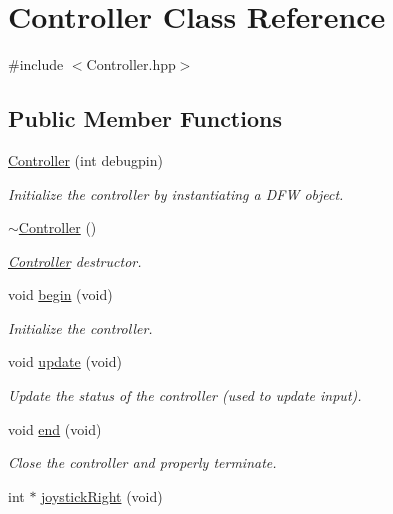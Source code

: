 \hypertarget{class_controller}{}\section{Controller Class Reference}
\label{class_controller}


{\ttfamily \#include $<$Controller.\+hpp$>$}

\subsection*{Public Member Functions}
\begin{DoxyCompactItemize}
\item 
\hyperlink{class_controller_aab64b54728b3f5d68bd2320605bdc51d}{Controller} (int debugpin)
\begin{DoxyCompactList}\small\item\em Initialize the controller by instantiating a D\+FW object. \end{DoxyCompactList}\item 
\hyperlink{class_controller_a0ab87934c4f7a266cfdb86e0f36bc1b5}{$\sim$\+Controller} ()
\begin{DoxyCompactList}\small\item\em \hyperlink{class_controller}{Controller} destructor. \end{DoxyCompactList}\item 
void \hyperlink{class_controller_a338cdce0f0f662c96fd2d76b7733736a}{begin} (void)
\begin{DoxyCompactList}\small\item\em Initialize the controller. \end{DoxyCompactList}\item 
void \hyperlink{class_controller_af52a1a5515bdf3be57bbab75b2b79e5a}{update} (void)
\begin{DoxyCompactList}\small\item\em Update the status of the controller (used to update input). \end{DoxyCompactList}\item 
void \hyperlink{class_controller_a7cdeade73d459b6a3279b9d0e2598117}{end} (void)
\begin{DoxyCompactList}\small\item\em Close the controller and properly terminate. \end{DoxyCompactList}\item 
int $\ast$ \hyperlink{class_controller_a99b39f4782ef2164dc3d3d1b512330bd}{joystick\+Right} (void)

\end{DoxyCompactItemize}
